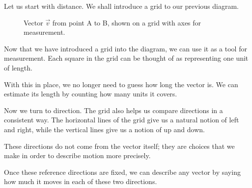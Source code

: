 \documentclass[11pt,openany]{book}
\theoremstyle{definition}
\begin{document}
\medskip

Let us start with distance. We shall introduce a grid to our previous diagram.

\begin{figure}[H]
\centering
{}
\caption{Vector $\vec{v}$ from point A to B, shown on a grid with axes for measurement.}
\end{figure}

Now that we have introduced a grid into the diagram, we can use it as a tool for measurement.
Each square in the grid can be thought of as representing one unit of length.

\medskip

With this in place, we no longer need to guess how long the vector is.
We can estimate its length by counting how many units it covers.

\medskip

Now we turn to direction. The grid also helps us compare directions in a consistent way.
The horizontal lines of the grid give us a natural notion of left and right, while the vertical lines give us a notion of up and down.

\medskip

These directions do not come from the vector itself; they are choices that we make in order to describe motion more precisely.

\medskip

Once these reference directions are fixed, we can describe any vector by saying how much it moves in each of these two directions.
\end{document}

